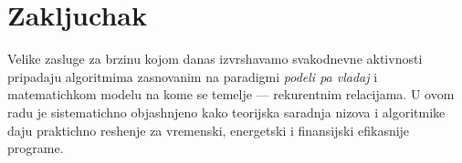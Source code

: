 \documentclass{article}
\theoremstyle{definition}
\begin{document}
\section*{Zakljuchak}
Velike zasluge za brzinu kojom danas izvrshavamo svakodnevne ak\-tiv\-no\-sti pripadaju algoritmima zasnovanim na paradigmi \emph{podeli pa vladaj} i matematichkom modelu na kome se temelje --- rekurentnim re\-la\-ci\-ja\-ma. U ovom radu je sistematichno objashnjeno kako teorijska sa\-rad\-nja nizova i algoritmike daju praktichno reshenje za vremenski, energet{}ski i fi\-nan\-sij\-ski efikasnije programe.
\end{document}
